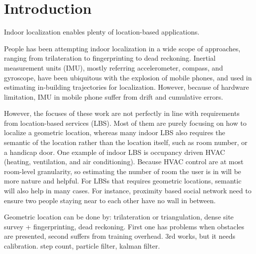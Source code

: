 \section{Introduction}
\label{sec:intro}


Indoor localization enables plenty of location-based applications. 




People has been attempting indoor localization in a wide scope of approaches, ranging from 
trilateration to fingerprinting to dead reckoning. Inertial measurement units (IMU), 
mostly referring accelerometer, 
compass, and gyroscope, have been ubiquitous with the explosion of mobile phones, and used in
estimating in-building trajectories for localization. However, because of hardware limitation, 
IMU in mobile phone suffer from drift and cumulative errors. 



However, the focuses of these work are not perfectly in line with requirements from location-based services (LBS). 
Most of them are purely focusing on how to localize a geometric location, whereas 
many indoor LBS also requires the semantic of the location rather than the location itself, such as room number,
or a handicap door.  
One example of indoor LBS is occupancy driven HVAC (heating, ventilation, and air conditioning).
Because HVAC control are at most room-level granularity, so estimating the number of room the 
user is in will be more nature and helpful. For LBSs that requires geometric locations, semantic will also help
in many cases. For instance, proximity based social network \fxnote{[cite]} need to ensure two people staying near
to each other have no wall in between. 



Geometric location can be done by: trilateration or triangulation, dense site survey + fingerprinting, dead reckoning.
First one has problems when obstacles are presented, second suffers from training overhead. 3rd works, but it needs calibration. 
step count, particle filter, kalman filter.



